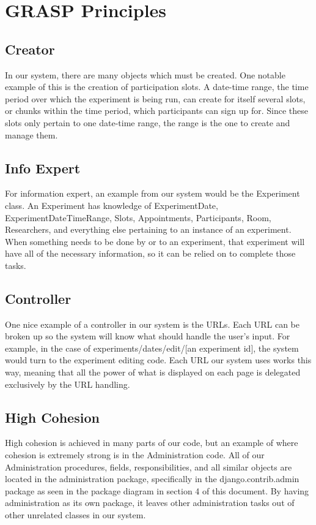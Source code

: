 \section{GRASP Principles}
\subsection{Creator}
In our system, there are many objects which must be created.  One notable example of this is the creation of participation slots.  A date-time range, the time period over which the experiment is being run, can create for itself several slots, or chunks within the time period, which participants can sign up for.  Since these slots only pertain to one date-time range, the range is the one to create and manage them.

\subsection{Info Expert}
For information expert, an example from our system would be the Experiment class.  An Experiment has knowledge of ExperimentDate, ExperimentDateTimeRange, Slots, Appointments, Participants, Room, Researchers, and everything else pertaining to an instance of an experiment.  When something needs to be done by or to an experiment, that experiment will have all of the necessary information, so it can be relied on to complete those tasks.

\subsection{Controller}
One nice example of a controller in our system is the URLs.  Each URL can be broken up so the system will know what should handle the user's input.  For example, in the case of experiments/dates/edit/[an experiment id], the system would turn to the experiment editing code.  Each URL our system uses works this way, meaning that all the power of what is displayed on each page is delegated exclusively by the URL handling.

\subsection{High Cohesion}
High cohesion is achieved in many parts of our code, but an example of where cohesion is extremely strong is in the Administration code.  All of our Administration  procedures, fields, responsibilities, and all similar objects are located in the administration package, specifically in the django.contrib.admin package as seen in the package diagram in section 4 of this document.  By having administration as its own package, it leaves other administration tasks out of other unrelated classes in our system.

